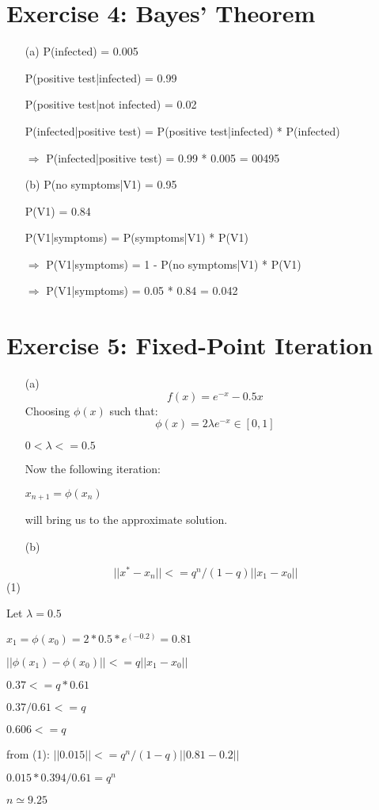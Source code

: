 \documentclass[unicode,11pt,a4paper,oneside,numbers=endperiod,openany]{scrartcl}
\begin{document}
\section*{Exercise 4: Bayes' Theorem}
\begin{enumerate}
	\item[(a)]
	{P(infected) = 0.005}
	
	{P(positive test|infected) = 0.99}
	
	{P(positive test|not infected) = 0.02}
	
	{P(infected|positive test)} = {P(positive test|infected)} * {P(infected)}
	
    $\Rightarrow$ {P(infected|positive test)} = 0.99 * 0.005 = 00495
    
	\item[(b)]
	{P(no symptoms|V1)} = 0.95
	
	{P(V1)} = 0.84
	
    {P(V1|symptoms)} = {P(symptoms|V1)} * {P(V1)}
    
	$\Rightarrow$ {P(V1|symptoms)} = {1 - P(no symptoms|V1)} * {P(V1)}
	
	$\Rightarrow$ {P(V1|symptoms)} = 0.05 * 0.84 = 0.042

	 
\end{enumerate}

\section*{Exercise 5: Fixed-Point Iteration}
\begin{enumerate}
\item[(a)]
 \[ f(x) = e^{-x} - 0.5x \]
 Choosing $\phi(x)$ such that:
 \[ \phi(x) = 2\lambda e^{-x}  \in [0, 1] \]
 
 \Rightarrow  $0 < \lambda <= 0.5 $
 
 Now the following iteration:
 
 $x_{n+1} = \phi(x_n)$
 
 will bring us to the approximate solution.
 
\item[(b)]
\end{enumerate}

\[ ||x^* - x_n|| <= q^n/(1-q)||x_1 - x_0|| \]   (1)

Let $\lambda = 0.5$

$x_1 = \phi(x_0) = 2*0.5*e^(-0.2) = 0.81$


 $||\phi(x_1) - \phi(x_0)|| <= q||x_1 - x_0||$
 
 \Rightarrow $0.37 <= q*0.61$
 
 \Rightarrow $0.37/0.61 <= q$
 
 \Rightarrow $0.606 <= q$

from (1):
$||0.015|| <= q^n/(1-q)||0.81 - 0.2|| $

\Rightarrow $0.015 * 0.394 / 0.61 = q^n$

\Rightarrow $n \simeq 9.25$


  
\end{document}
